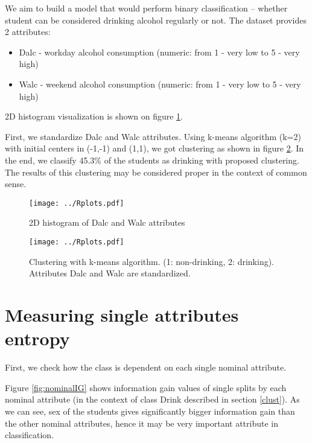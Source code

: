 \documentclass[a4paper]{article}
\begin{document}
We aim to build a model that would perform binary classification --
whether student can be considered drinking alcohol regularly or not.
The dataset provides 2 attributes:
\begin{itemize}
    \item Dalc - workday alcohol consumption (numeric: from 1 - very low to 5 - very high)
    \item Walc - weekend alcohol consumption (numeric: from 1 - very low to 5 - very high)
\end{itemize}
2D histogram visualization is shown on figure \ref{fig:hist2D}.

First, we standardize Dalc and Walc attributes.
Using k-means algorithm (k=2) with initial centers in (-1,-1) and (1,1), we got clustering as shown in figure \ref{fig:clust}.
In the end, we classify 45.3\% of the students as drinking with proposed clustering.
The results of this clustering may be considered proper in the context of common sense.



\begin{figure}[!hbt]
    \centering
    \texttt{[image: ../Rplots.pdf]}
    \caption[]{2D histogram of Dalc and Walc attributes
    \label{fig:hist2D}
    }
\end{figure}

\begin{figure}[!hbt]
    \centering
    \texttt{[image: ../Rplots.pdf]}
    \caption[]{Clustering with k-means algorithm. (1: non-drinking, 2: drinking).
                Attributes Dalc and Walc are standardized.
    \label{fig:clust}
    }
\end{figure}

\section{Measuring single attributes entropy}
\label{xent}
First, we check how the class is dependent on each single nominal attribute.

Figure \ref{fig:nominalIG} shows information gain values
of single splits by each nominal attribute (in the context of class Drink described in section \ref{clust}).
As we can see, sex of the students gives significantly bigger information gain
than the other nominal attributes, hence it may be very important attribute
in classification.
\end{document}
